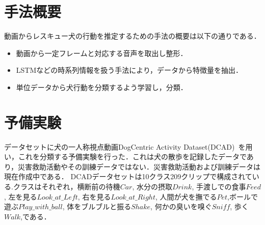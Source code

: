 \section{手法概要}
動画からレスキュー犬の行動を推定するための手法の概要は以下の通りである．
\begin{itemize}
 \item 動画から一定フレームと対応する音声を取出し整形．
 \item LSTMなどの時系列情報を扱う手法により，データから特徴量を抽出．
 \item 単位データから犬行動を分類するよう学習し，分類．
\end{itemize}

\section{予備実験}
データセットに犬の一人称視点動画DogCentric Activity Dataset(DCAD)~\cite{yumi2014first}を用い，これを分類する予備実験を行った．これは犬の散歩を記録したデータであり，災害救助活動やその訓練データではない．災害救助活動および訓練データは現在作成中である．
DCADデータセットは10クラス209クリップで構成されている.クラスはそれぞれ，横断前の待機\(Car\), 水分の摂取\(Drink\), 手渡しでの食事\(Feed\), 左を見る\(Look\_at\_Left\), 右を見る\(Look\_at\_Right\), 人間が犬を撫でる\(Pet\),ボールで遊ぶ\(Play\_with\_ball\), 体をブルブルと振る\(Shake\), 何かの臭いを嗅ぐ\(Sniff\), 歩く\(Walk\),である．

